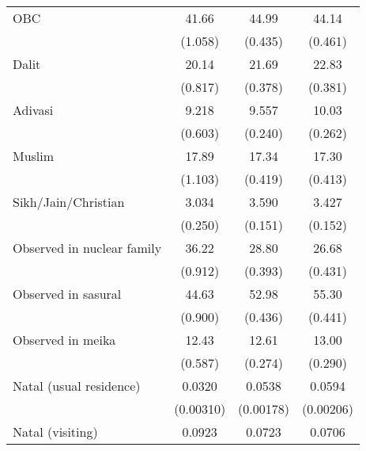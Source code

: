 {\begin{tabular}{l*{3}{c}}
\addlinespace
OBC                 &       41.66\sym{***}&       44.99\sym{***}&       44.14\sym{***}\\
                    &     (1.058)         &     (0.435)         &     (0.461)         \\
\addlinespace
Dalit               &       20.14\sym{***}&       21.69\sym{***}&       22.83\sym{***}\\
                    &     (0.817)         &     (0.378)         &     (0.381)         \\
\addlinespace
Adivasi             &       9.218\sym{***}&       9.557\sym{***}&       10.03\sym{***}\\
                    &     (0.603)         &     (0.240)         &     (0.262)         \\
\addlinespace
Muslim              &       17.89\sym{***}&       17.34\sym{***}&       17.30\sym{***}\\
                    &     (1.103)         &     (0.419)         &     (0.413)         \\
\addlinespace
Sikh/Jain/Christian &       3.034\sym{***}&       3.590\sym{***}&       3.427\sym{***}\\
                    &     (0.250)         &     (0.151)         &     (0.152)         \\
\addlinespace
Observed in nuclear family&       36.22\sym{***}&       28.80\sym{***}&       26.68\sym{***}\\
                    &     (0.912)         &     (0.393)         &     (0.431)         \\
\addlinespace
Observed in sasural &       44.63\sym{***}&       52.98\sym{***}&       55.30\sym{***}\\
                    &     (0.900)         &     (0.436)         &     (0.441)         \\
\addlinespace
Observed in meika   &       12.43\sym{***}&       12.61\sym{***}&       13.00\sym{***}\\
                    &     (0.587)         &     (0.274)         &     (0.290)         \\
\addlinespace
Natal (usual residence)&      0.0320\sym{***}&      0.0538\sym{***}&      0.0594\sym{***}\\
                    &   (0.00310)         &   (0.00178)         &   (0.00206)         \\
\addlinespace
Natal (visiting)    &      0.0923\sym{***}&      0.0723\sym{***}&      0.0706\sym{***}\\

\end{tabular}}
